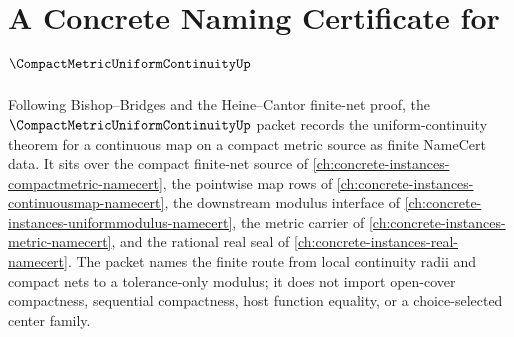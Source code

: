 \chapter{A Concrete Naming Certificate for $\CompactMetricUniformContinuityUp$}
\label{ch:concrete-instances-compact-metric-uniform-continuity-namecert}

Following Bishop--Bridges and the Heine--Cantor finite-net proof, the $\CompactMetricUniformContinuityUp$ packet records the uniform-continuity theorem for a continuous map on a compact metric source as finite NameCert data. It sits over the compact finite-net source of \autoref{ch:concrete-instances-compactmetric-namecert}, the pointwise map rows of \autoref{ch:concrete-instances-continuousmap-namecert}, the downstream modulus interface of \autoref{ch:concrete-instances-uniformmodulus-namecert}, the metric carrier of \autoref{ch:concrete-instances-metric-namecert}, and the rational real seal of \autoref{ch:concrete-instances-real-namecert}. The packet names the finite route from local continuity radii and compact nets to a tolerance-only modulus; it does not import open-cover compactness, sequential compactness, host function equality, or a choice-selected center family.

